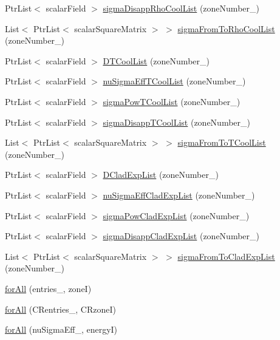 \begin{DoxyCompactItemize}
\item 
Ptr\+List$<$ scalar\+Field $>$ \hyperlink{readNuclearDataLowMem_8H_a09ecb37caeb3824fcc43759fba4ada33}{sigma\+Disapp\+Rho\+Cool\+List} (zone\+Number\+\_\+)
\item 
List$<$ Ptr\+List$<$ scalar\+Square\+Matrix $>$ $>$ \hyperlink{readNuclearDataLowMem_8H_af0208ac90cc1c2153e8a9206cdb79457}{sigma\+From\+To\+Rho\+Cool\+List} (zone\+Number\+\_\+)
\item 
Ptr\+List$<$ scalar\+Field $>$ \hyperlink{readNuclearDataLowMem_8H_afb5b5d357f9a51bcd4e5f519814f7c7d}{D\+T\+Cool\+List} (zone\+Number\+\_\+)
\item 
Ptr\+List$<$ scalar\+Field $>$ \hyperlink{readNuclearDataLowMem_8H_a56bd2aa6903ca24b2996478e3069acb4}{nu\+Sigma\+Eff\+T\+Cool\+List} (zone\+Number\+\_\+)
\item 
Ptr\+List$<$ scalar\+Field $>$ \hyperlink{readNuclearDataLowMem_8H_a9b4bf9eec4053cfd73f50b3166ee4238}{sigma\+Pow\+T\+Cool\+List} (zone\+Number\+\_\+)
\item 
Ptr\+List$<$ scalar\+Field $>$ \hyperlink{readNuclearDataLowMem_8H_a2c85d8518fcb8e2373c337b4a0b9f12b}{sigma\+Disapp\+T\+Cool\+List} (zone\+Number\+\_\+)
\item 
List$<$ Ptr\+List$<$ scalar\+Square\+Matrix $>$ $>$ \hyperlink{readNuclearDataLowMem_8H_aec00aee42aa4bcc866c55a2bf28e718f}{sigma\+From\+To\+T\+Cool\+List} (zone\+Number\+\_\+)
\item 
Ptr\+List$<$ scalar\+Field $>$ \hyperlink{readNuclearDataLowMem_8H_a0b20f5d5d3a7d538732a088700162f17}{D\+Clad\+Exp\+List} (zone\+Number\+\_\+)
\item 
Ptr\+List$<$ scalar\+Field $>$ \hyperlink{readNuclearDataLowMem_8H_a5fcf82349fabf302f7082bfe6b409805}{nu\+Sigma\+Eff\+Clad\+Exp\+List} (zone\+Number\+\_\+)
\item 
Ptr\+List$<$ scalar\+Field $>$ \hyperlink{readNuclearDataLowMem_8H_a7a20b2877f90d44db7ef821a29b92227}{sigma\+Pow\+Clad\+Exp\+List} (zone\+Number\+\_\+)
\item 
Ptr\+List$<$ scalar\+Field $>$ \hyperlink{readNuclearDataLowMem_8H_a6535e9cb52020c71b8a387a09bbbd308}{sigma\+Disapp\+Clad\+Exp\+List} (zone\+Number\+\_\+)
\item 
List$<$ Ptr\+List$<$ scalar\+Square\+Matrix $>$ $>$ \hyperlink{readNuclearDataLowMem_8H_a127596d2781e3b87e8eb3468b5e38c0d}{sigma\+From\+To\+Clad\+Exp\+List} (zone\+Number\+\_\+)
\item 
\hyperlink{readNuclearDataLowMem_8H_a1ba0a86d00d625275de858f1a01edb9f}{for\+All} (entries\+\_\+, zoneI)
\item 
\hyperlink{readNuclearDataLowMem_8H_a2428955ee674d42574e73d905589463a}{for\+All} (C\+Rentries\+\_\+, C\+RzoneI)
\item 
\hyperlink{readNuclearDataLowMem_8H_a18680aaf1d13afdaf2eedb40096566be}{for\+All} (nu\+Sigma\+Eff\+\_\+, energyI)
\end{DoxyCompactItemize}


